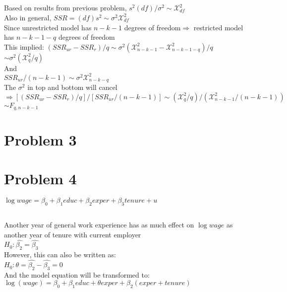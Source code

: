 \documentclass[11pt, oneside]{article}   	%
\begin{document}
\subsection{}
Based on results from previous problem, $s^2(df)/\sigma^2\sim\mathcal{X}_{df}^2$\\
Also in general, $SSR=(df)s^2\sim\sigma^2\mathcal{X}_{df}^2$\\
Since unrestricted model has $n-k-1$ degrees of freedom$\Rightarrow$ restricted model has $n-k-1-q$ degrees of freedom\\
This implied:
\indent $(SSR_{ur}-SSR_r)/q\sim\sigma^2(\mathcal{X}_{n-k-1}^2-\mathcal{X}_{n-k-1-q}^2)/q$\\
\indent\indent$\sim\sigma^2(\mathcal{X}_q^2/q)$\\
\indent And\\
\indent$SSR_{ur}/(n-k-1)\sim\sigma^2\mathcal{X}^2_{n-k-q}$\\
\indent The $\sigma^2$ in top and bottom will cancel\\
\indent$\Rightarrow[(SSR_{ur}-SSR_r)/q]/[SSR_{ur}/(n-k-1)]\sim(\mathcal{X}_q^2/q)/(\mathcal{X}_{n-k-1}^2/(n-k-1))$\\
\indent$\sim F_{q,n-k-1}$\\

\section{Problem 3}


\section{Problem 4}
$\log{wage}=\beta_0+\beta_1educ+\beta_2exper+\beta_3tenure+u$\\
\subsection{}
Another year of general work experience has as much effect on $\log{wage}$ as another year of tenure with current employer\\
\indent$H_0: \hat{\beta_2}=\hat{\beta_3}$\\
\indent However, this can also be written as:\\
\indent$H_0: \theta=\hat{\beta_2}-\hat{\beta_3}=0$\\
\indent And the model equation will be transformed to:\\
\indent$\log(wage)=\beta_0+\beta_1educ+\theta exper+\beta_2(exper+tenure)$\\
\end{document}
